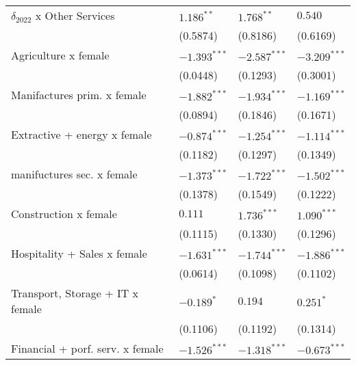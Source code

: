 \begin{tabular}{llll}
$\delta_{2022}$ x Other Services                   &       $1.186^{**}$ &       $1.768^{**}$ &            $0.540$ \\
                                                   &           (0.5874) &           (0.8186) &           (0.6169) \\
Agriculture x female                               &     $-1.393^{***}$ &     $-2.587^{***}$ &     $-3.209^{***}$ \\
                                                   &           (0.0448) &           (0.1293) &           (0.3001) \\
Manifactures prim. x female                        &     $-1.882^{***}$ &     $-1.934^{***}$ &     $-1.169^{***}$ \\
                                                   &           (0.0894) &           (0.1846) &           (0.1671) \\
Extractive + energy x female                       &     $-0.874^{***}$ &     $-1.254^{***}$ &     $-1.114^{***}$ \\
                                                   &           (0.1182) &           (0.1297) &           (0.1349) \\
manifuctures sec. x female                         &     $-1.373^{***}$ &     $-1.722^{***}$ &     $-1.502^{***}$ \\
                                                   &           (0.1378) &           (0.1549) &           (0.1222) \\
Construction x female                              &            $0.111$ &      $1.736^{***}$ &      $1.090^{***}$ \\
                                                   &           (0.1115) &           (0.1330) &           (0.1296) \\
Hospitality + Sales x female                       &     $-1.631^{***}$ &     $-1.744^{***}$ &     $-1.886^{***}$ \\
                                                   &           (0.0614) &           (0.1098) &           (0.1102) \\
Transport, Storage + IT x female                   &         $-0.189^*$ &            $0.194$ &          $0.251^*$ \\
                                                   &           (0.1106) &           (0.1192) &           (0.1314) \\
Financial + porf. serv. x female                   &     $-1.526^{***}$ &     $-1.318^{***}$ &     $-0.673^{***}$ \\

\end{tabular}
